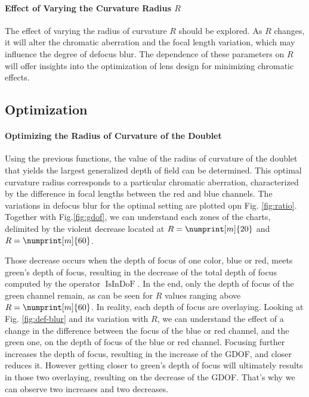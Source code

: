 \documentclass[10pt,letterpaper]{article}
\begin{document}
\paragraph{Effect of Varying the Curvature Radius \(R\)\\}
The effect of varying the radius of curvature \(R\) should be explored. As \(R\) changes, it will alter the chromatic aberration and the focal length variation, which may influence the degree of defocus blur. The dependence of these parameters on \(R\) will offer insights into the optimization of lens design for minimizing chromatic effects.


\subsection*{Optimization}

\paragraph{Optimizing the Radius of Curvature of the Doublet\\}
Using the previous functions, the value of the radius of curvature of the doublet that yields the largest generalized depth of field can be determined. This optimal curvature radius corresponds to a particular chromatic aberration, characterized by the difference in focal lengths between the red and blue channels. The variations in defocus blur for the optimal setting are plotted opn Fig. \ref{fig:ratio}. Together with Fig.\ref{fig:gdof}, we can understand each zones of the charts, delimited by the violent decrease located at $R = \numprint[m]{20}$ and $R = \numprint[m]{60}$.

Those decrease occurs when the depth of focus of one color, blue or red, meets green's depth of focus, resulting in the decrease of the total depth of focus computed by the operator $\operatorname{IsInDoF}$. In the end, only the depth of focus of the green channel remain, as can be seen for $R$ values ranging above $R = \numprint[m]{60}$. In reality, each depth of focus are overlaying. Looking at Fig. \ref{fig:def-blur} and its variation with $R$, we can understand the effect of a change in the difference between the focus of the blue or red channel, and the green one, on the depth of focus of the blue or red channel. Focusing further increases the depth of focus, resulting in the increase of the GDOF, and closer reduces it. However getting closer to green's depth of focus will ultimately results in those two overlaying, resulting on the decrease of the GDOF. That's why we can observe two increases and two decreases.
\end{document}
